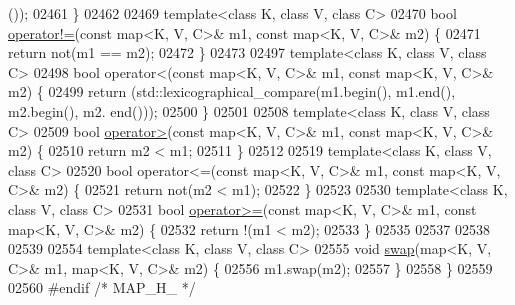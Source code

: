 \begin{DoxyCode}
      ());
02461 \}
02462 
02469 \textcolor{keyword}{template}<\textcolor{keyword}{class} K, \textcolor{keyword}{class} V, \textcolor{keyword}{class} C>
02470 \textcolor{keywordtype}{bool} \hyperlink{classaed2_1_1map_abce0fa35c5b25fd67111c2e704616f09_abce0fa35c5b25fd67111c2e704616f09}{operator!=}(\textcolor{keyword}{const} map<K, V, C>& m1, \textcolor{keyword}{const} map<K, V, C>& m2) \{
02471     \textcolor{keywordflow}{return} not(m1 == m2);
02472 \}
02473 
02497 \textcolor{keyword}{template}<\textcolor{keyword}{class} K, \textcolor{keyword}{class} V, \textcolor{keyword}{class} C>
02498 \textcolor{keywordtype}{bool} operator<(const map<K, V, C>& m1, \textcolor{keyword}{const} map<K, V, C>& m2) \{
02499     \textcolor{keywordflow}{return} (std::lexicographical\_compare(m1.begin(), m1.end(), m2.begin(), m2.
      end()));
02500 \}
02501 
02508 \textcolor{keyword}{template}<\textcolor{keyword}{class} K, \textcolor{keyword}{class} V, \textcolor{keyword}{class} C>
02509 \textcolor{keywordtype}{bool} \hyperlink{classaed2_1_1map_a2000cd874b72034ce7fe730c811b6c63_a2000cd874b72034ce7fe730c811b6c63}{operator>}(\textcolor{keyword}{const} map<K, V, C>& m1, \textcolor{keyword}{const} map<K, V, C>& m2) \{
02510     \textcolor{keywordflow}{return} m2 < m1;
02511 \}
02512 
02519 \textcolor{keyword}{template}<\textcolor{keyword}{class} K, \textcolor{keyword}{class} V, \textcolor{keyword}{class} C>
02520 \textcolor{keywordtype}{bool} operator<=(const map<K, V, C>& m1, \textcolor{keyword}{const} map<K, V, C>& m2) \{
02521     \textcolor{keywordflow}{return} not(m2 < m1);
02522 \}
02523 
02530 \textcolor{keyword}{template}<\textcolor{keyword}{class} K, \textcolor{keyword}{class} V, \textcolor{keyword}{class} C>
02531 \textcolor{keywordtype}{bool} \hyperlink{classaed2_1_1map_a093a6d1a055339c5fc6297a1d47a9159_a093a6d1a055339c5fc6297a1d47a9159}{operator>=}(\textcolor{keyword}{const} map<K, V, C>& m1, \textcolor{keyword}{const} map<K, V, C>& m2) \{
02532     \textcolor{keywordflow}{return} !(m1 < m2);
02533 \}
02535 
02537 
02538 
02539 
02554 \textcolor{keyword}{template}<\textcolor{keyword}{class} K, \textcolor{keyword}{class} V, \textcolor{keyword}{class} C>
02555 \textcolor{keywordtype}{void} \hyperlink{classaed2_1_1map_a119cb2938bbc11c25ebd4fb824782a72_a119cb2938bbc11c25ebd4fb824782a72}{swap}(map<K, V, C>& m1, map<K, V, C>& m2) \{
02556     m1.swap(m2);
02557 \}
02558 \}
02559 
02560 \textcolor{preprocessor}{#endif }\textcolor{comment}{/* MAP\_H\_ */}
\end{DoxyCode}
